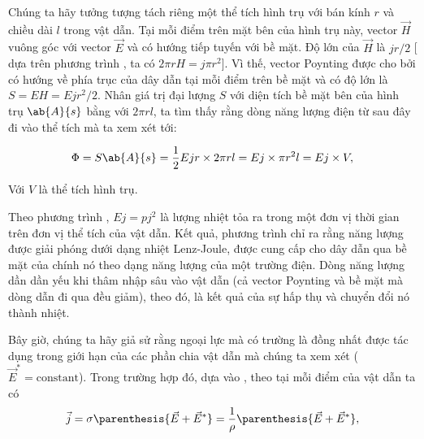 Chúng ta hãy tưởng tượng tách riêng một thể tích hình trụ với bán kính $r$ và chiều dài $l$ trong vật dẫn.
Tại mỗi điểm trên mặt bên của hình trụ này, vector $\vec{H}$ vuông góc với vector $\vec{E}$ và có hướng tiếp tuyến với bề mặt.
Độ lớn của $\vec{H}$ là $jr/2$ [ dựa trên phương trình , ta có $2\pi rH = j\pi r^2$].
Vì thế, vector Poynting được cho bởi  có hướng về phía trục của dây dẫn tại mỗi điểm trên bề mặt và có độ lớn là $S=EH=Ej r^2/2$.
Nhân giá trị đại lượng $S$ với diện tích bề mặt bên của hình trụ $\ab{A}{s}$ bằng với $2\pi rl$, ta tìm thấy rằng dòng năng lượng điện từ sau đây đi vào thể tích mà ta xem xét tới:

\begin{equation}\label{eq:15_31}
    \Phi = S \ab{A}{s} = \frac{1}{2} Ejr \times 2\pi rl = Ej \times \pi r^2 l = Ej \times V,
\end{equation}

\noindent
Với $V$ là thể tích hình trụ.


Theo phương trình , $Ej = pj^2$ là lượng nhiệt tỏa ra trong một đơn vị thời gian trên đơn vị thể tích của vật dẫn.
Kết quả, phương trình chỉ ra rằng năng lượng được giải phóng dưới dạng nhiệt Lenz-Joule, được cung cấp cho dây dẫn qua bề mặt của chính nó theo dạng năng lượng của một trường điện.
Dòng năng lượng dần dần yếu khi thâm nhập sâu vào vật dẫn (cả vector Poynting và bề mặt mà dòng dẫn đi qua đều giảm), theo đó, là kết quả của sự hấp thụ và chuyển đổi nó thành nhiệt.



Bây giờ, chúng ta hãy giả sử rằng ngoại lực mà có trường là đồng nhất được tác dụng trong giới hạn của các phần chia vật dẫn mà chúng ta xem xét ($\vec{E}^*=\text{constant}$).
Trong trường hợp đó, dựa vào , theo tại mỗi điểm của vật dẫn ta có
\begin{equation*}
    \vec{j} = \sigma \parenthesis{\vec{E} + \vec{E}^*} = \frac{1}{\rho} \parenthesis{\vec{E} + \vec{E}^*},
\end{equation*}

